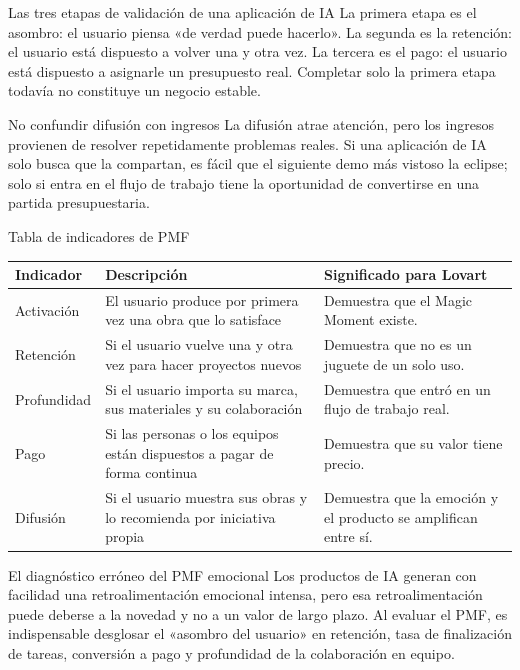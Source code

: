 \begin{importantbox}{Las tres etapas de validación de una aplicación de IA}
La primera etapa es el asombro: el usuario piensa «de verdad puede hacerlo». La segunda es la retención: el usuario está dispuesto a volver una y otra vez. La tercera es el pago: el usuario está dispuesto a asignarle un presupuesto real. Completar solo la primera etapa todavía no constituye un negocio estable.
\end{importantbox}

\begin{warningbox}{No confundir difusión con ingresos}
La difusión atrae atención, pero los ingresos provienen de resolver repetidamente problemas reales. Si una aplicación de IA solo busca que la compartan, es fácil que el siguiente demo más vistoso la eclipse; solo si entra en el flujo de trabajo tiene la oportunidad de convertirse en una partida presupuestaria.
\end{warningbox}

\begin{knowledgebox}{Tabla de indicadores de PMF}
\begin{tabularx}{\textwidth}{p{}p{}X}
\toprule
Indicador & Descripción & Significado para Lovart \\
\midrule
Activación & El usuario produce por primera vez una obra que lo satisface & Demuestra que el Magic Moment existe. \\
Retención & Si el usuario vuelve una y otra vez para hacer proyectos nuevos & Demuestra que no es un juguete de un solo uso. \\
Profundidad & Si el usuario importa su marca, sus materiales y su colaboración & Demuestra que entró en un flujo de trabajo real. \\
Pago & Si las personas o los equipos están dispuestos a pagar de forma continua & Demuestra que su valor tiene precio. \\
Difusión & Si el usuario muestra sus obras y lo recomienda por iniciativa propia & Demuestra que la emoción y el producto se amplifican entre sí. \\
\bottomrule
\end{tabularx}
\end{knowledgebox}

\begin{warningbox}{El diagnóstico erróneo del PMF emocional}
Los productos de IA generan con facilidad una retroalimentación emocional intensa, pero esa retroalimentación puede deberse a la novedad y no a un valor de largo plazo. Al evaluar el PMF, es indispensable desglosar el «asombro del usuario» en retención, tasa de finalización de tareas, conversión a pago y profundidad de la colaboración en equipo.
\end{warningbox}

